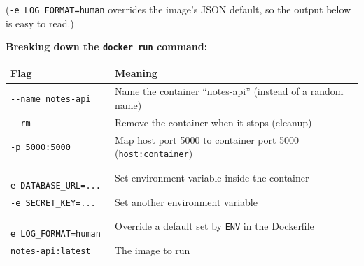 \begin{codebox}[short]

\begin{Shaded}
\begin{Highlighting}[]
\DataTypeTok{\textbackslash{}}
  \DataTypeTok{\textbackslash{}}
   \DataTypeTok{\textbackslash{}}
  \DataTypeTok{\textbackslash{}}
   \DataTypeTok{\textbackslash{}}
   \DataTypeTok{\textbackslash{}}
  \DataTypeTok{\textbackslash{}}
\end{Highlighting}
\end{Shaded}

\end{codebox}

\noindent{}(\texttt{-e\ LOG\_FORMAT=}\allowbreak{}\texttt{human} overrides the image's JSON default, so the output below is easy to read.)

\textbf{Breaking down the \texttt{docker\ run} command:}


{\def\LTcaptype{none} %
\begin{longtable}[]{@{}
  >{\raggedright\arraybackslash}p{}
  >{\raggedright\arraybackslash}p{}@{}}
\toprule\noalign{}
\begin{minipage}[b]{\linewidth}\raggedright
Flag
\end{minipage} & \begin{minipage}[b]{\linewidth}\raggedright
Meaning
\end{minipage} \\
\midrule\noalign{}
\endhead
\bottomrule\noalign{}
\endlastfoot
\texttt{-\/-name\ notes-api} & Name the container ``notes-api'' (instead of a random name) \\
\texttt{-\/-rm} & Remove the container when it stops (cleanup) \\
\texttt{-p\ 5000:5000} & Map host port 5000 to container port 5000 (\texttt{host:container}) \\
\texttt{-e\ DATABASE\_URL=}\allowbreak{}\texttt{...} & Set environment variable inside the container \\
\texttt{-e\ SECRET\_KEY=...} & Set another environment variable \\
\texttt{-e\ LOG\_FORMAT=}\allowbreak{}\texttt{human} & Override a default set by \texttt{ENV} in the Dockerfile \\
\texttt{notes-api:latest} & The image to run \\
\end{longtable}
}

